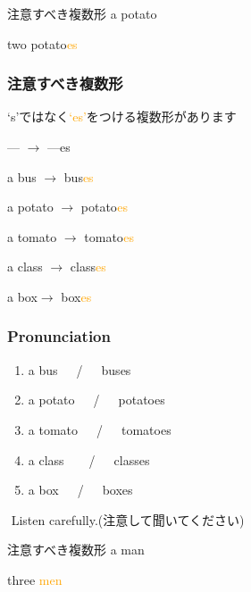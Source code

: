 \documentclass[aspectratio=169]{beamer}
\newcommand{\myaudio}[1]{\href{#1}{\faVolumeUp}}
\begin{document}
\begin{frame}[plain]{注意すべき複数形}
\hspace{15pt}
\pause
{\LARGE a potato}
\pause

\bigskip

\bigskip

\hspace{15pt}
\pause
{\LARGE two  potato\textcolor{orange}{es}}
\end{frame}

\begin{frame}[plain]\frametitle{注意すべき複数形}

{\Large `s'ではなく\textcolor{orange}{`es'}をつける複数形があります}
\pause

\bigskip

\begin{block}{--- $\rightarrow$ ---es}

a bus \pause$\longrightarrow$ bus\textcolor{orange}{es}\pause

a potato \pause$\longrightarrow$ potato\textcolor{orange}{es}\pause

a tomato \pause$\longrightarrow$ tomato\textcolor{orange}{es}\pause

a class \pause$\longrightarrow$ class\textcolor{orange}{es}\pause

a box\pause $\longrightarrow$ box\textcolor{orange}{es}
\end{block}

\end{frame}


\begin{frame}[plain]\frametitle{Pronunciation}

\begin{enumerate}
 \item a bus~~~\pause{}/~~~buses\pause
 \item a potato~~~\pause{}/~~~potatoes\pause
 \item a tomato~~~\pause{}/~~~tomatoes\pause
 \item a class~~~~\pause{}/~~~classes\pause
 \item a box~~~\pause{}/~~~boxes
 \end{enumerate}
\pause
\myaudio{./audio/005_singular_plural_02.mp3}\,\,{}Listen carefully.(注意して聞いてください)
\end{frame}


\begin{frame}[plain]{注意すべき複数形}
\scalebox{5}{\ManFace}\hspace{15pt}
\pause
{\LARGE a man}
\pause

\bigskip

\bigskip

\scalebox{5}{\ManFace\hspace{5pt}\ManFace\hspace{5pt}\ManFace}\hspace{15pt}
\pause
{\LARGE three  \textcolor{orange}{men}}
\end{frame}
\end{document}
